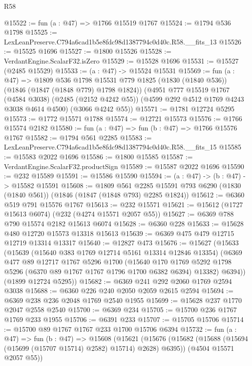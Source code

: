 \begin{lexlean}{R58}
\begin{coremodule}
@15522 := fun (a : @47) => @1766 @15519 @1767
@15524 := @1794 @536 @1798
@15525 := LexLeanPreserve.C794a6cad1b5e8fdc98d1387794c0d40c.R58.__fits_13
@15526 := @15525 @1696
@15527 := @1800 @15526
@15528 := VerdantEngine.ScalarF32.isZero
@15529 := @15528 @1696
@15531 := @15527 (@2485 @15529)
@15533 := (a : @47) -> @15524 @15531
@15569 := fun (a : @47) =>
  @1809
    @536
    @1798
    @15531
    @779
    @1825
    (@1830 (@1840 @536))
    (@1846 (@1847 (@1848 @779) @1798 @1824))
    (@4951
      @777
      @15519
      @1767
      (@4584 @3038)
      (@2485 (@2152 @4242 @55))
      (@4599 @292 @4512 @1769 @4243 @3038 @4614 @4500)
      (@3066 @4242 @55))
@15571 := @1781 @12724 @5295
@15573 := @1772 @15571 @1788
@15574 := @12721 @15573
@15576 := @1766 @15574 @2182
@15580 := fun (a : @47) => fun (b : @47) => @1766 @15576 @1767
@15582 := @1794 @561 @2285
@15583 := LexLeanPreserve.C794a6cad1b5e8fdc98d1387794c0d40c.R58.__fits_15
@15585 := @15583 @2022 @1696
@15586 := @1800 @15585
@15587 := VerdantEngine.ScalarF32.productSign
@15589 := @15587 @2022 @1696
@15590 := @232 @15589
@15591 := @15586 @15590
@15594 := (a : @47) -> (b : @47) -> @15582 @15591
@15608 := @1809
    @561
    @2285
    @15591
    @793
    @6290
    (@1830 (@1840 @561))
    (@1846 (@1847 (@1848 @793) @2285 @1824))
@15612 := @6360 @519 @791 @15576 @1767
@15613 := @232 @15571
@15621 := @15612 (@1727 @15613 @6074) (@232 (@4274 @15571 @2057 @55))
@15627 := @6369 @788 @790 @15574 @2182 @15613 @6074
@15628 := @6360 @228
@15633 := @15628 @480 @12720 @15573 @13318 @15613
@15639 := @6369 @475 @479 @12715 @12719 @13314 @13317
@15640 := @12827 @473
@15676 := @15627
    (@15633
      (@15639
        (@15640 @383 @1769 @12714 @5161 @13314 @12846 @13354)
        (@6369
          @477
          @89
          @12717
          @1767
          @5296
          @1700
          (@15640
            @170
            @1769
            @5292
            @1798
            @5296
            (@6370 @89 @1767 @1767 @1796 @1700 @6382 @6394)
            @13382)
          @6394))
      (@1899 @12724 @5295))
@15682 := @6369 @241 @292 @2060 @1769 @2594 @3038
@15688 := @6360 @226 @240 @2050 @2059 @2615 @2594
@15694 := @6369 @238 @236 @2048 @1769 @2540 @1955
@15699 := @15628 @237 @1770 @2047 @2558 @2540
@15700 := @6369 @234
@15705 := @15700 @236 @1767 @1769 @233 @1955
@15706 := @6391 @233
@15707 := @15705 @15706
@15714 := @15700 @89 @1767 @1767 @233 @1700 @15706 @6394
@15732 := fun (a : @47) =>
  fun (b : @47) =>
  @15608
    (@15621
      (@15676 (@15682 (@15688 (@15694 (@15699 (@15707 @15714) @2582) @15714) @2628) @6395))
      (@4504 @15571 @2057 @55))

\end{coremodule}
\end{lexlean}
